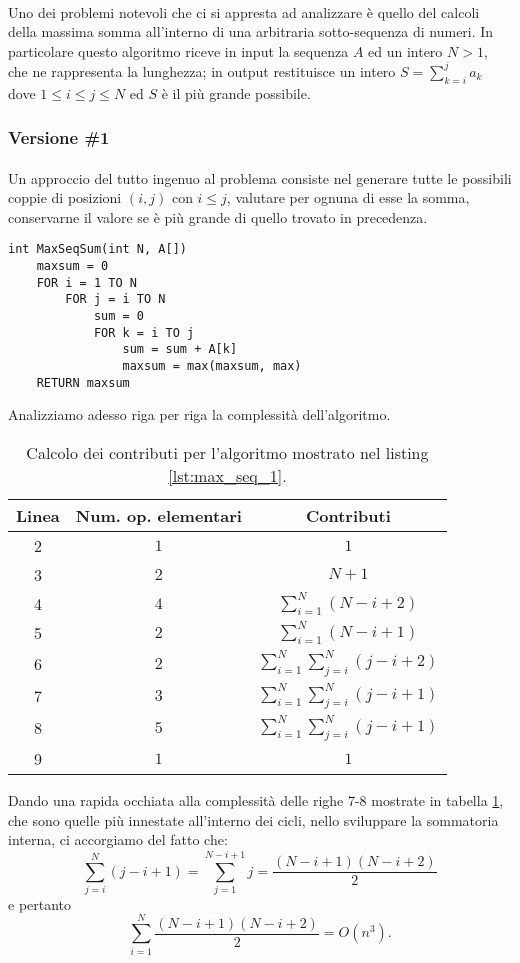 \documentclass[11pt,a4paper,oneside]{article}
\begin{document}
\paragraph*{} Uno dei problemi notevoli che ci si appresta ad analizzare è quello del calcoli della massima somma all'interno di una arbitraria sotto-sequenza di numeri. In particolare questo algoritmo riceve in input la sequenza $A$ ed un intero $N > 1$, che ne rappresenta la lunghezza; in output restituisce un intero $S = \sum_{k = i}^{j} a_k$ dove $1 \leq i \leq j \leq N$ ed $S$ è il più grande possibile.

\subsubsection{Versione \#1}
\paragraph*{} Un approccio del tutto ingenuo al problema consiste nel generare tutte le possibili coppie di posizioni $(i, j)$ con $i \leq j$, valutare per ognuna di esse la somma, conservarne il valore se è più grande di quello trovato in precedenza.

\begin{lstlisting}[caption={Calcolo della massima somma di una sotto-sequenza, versione 1.},label={lst:max_seq_1}]
int MaxSeqSum(int N, A[])
	maxsum = 0
	FOR i = 1 TO N 
		FOR j = i TO N
			sum = 0
			FOR k = i TO j
				sum = sum + A[k]
				maxsum = max(maxsum, max)
	RETURN maxsum
\end{lstlisting}
Analizziamo adesso riga per riga la complessità dell'algoritmo.
\begin{table}[h]
	\centering
	\begin{tabular}{ c | c | c }
		\textbf{Linea} & \textbf{Num. op. elementari} & \textbf{Contributi} \\ \hline
		2 & $1$ & $1$ \\
		3 & $2$ & $N+1$ \\
		4 & $4$ & $\sum_{i = 1}^{N}(N-i+2)$ \\ 
		5 & $2$ & $\sum_{i = 1}^{N}(N-i+1)$ \\
		6 & $2$ & $\sum_{i=1}^{N}{\sum_{j=i}^{N} (j-i+2)}$ \\
		7 & $3$ & $\sum_{i=1}^{N}{\sum_{j=i}^{N} (j-i+1)}$ \\
		8 & $5$ & $\sum_{i=1}^{N}{\sum_{j=i}^{N} (j-i+1)}$ \\
		9 & $1$ & $1$ \\ 
	\end{tabular}
	\caption{Calcolo dei contributi per l'algoritmo mostrato nel listing \ref{lst:max_seq_1}.}
	\label{tbl:max_seq_1}
\end{table}
Dando una rapida occhiata alla complessità delle righe 7-8 mostrate in tabella \ref{tbl:max_seq_1}, che sono quelle più innestate all'interno dei cicli, nello sviluppare la sommatoria interna, ci accorgiamo del fatto che:
$$\sum_{j = i}^{N}(j-i+1) = \sum_{j = 1}^{N-i+1} j = \dfrac{(N-i+1)(N-i+2)}{2}$$ e pertanto
$$\sum_{i = 1}^{N} \dfrac{(N-i+1)(N-i+2)}{2} = O(n^3)\text{.}$$
\end{document}
